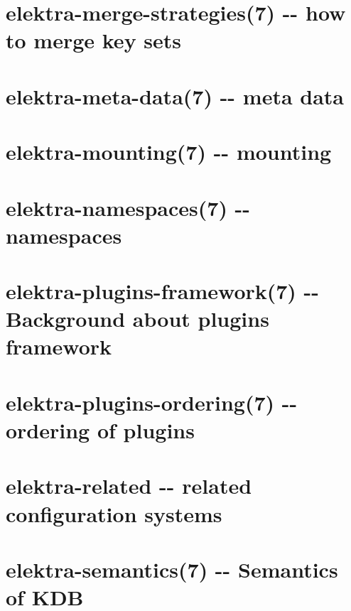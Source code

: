 \documentclass[twoside]{book}
\newcommand{\+}{\discretionary{\mbox{\scriptsize$\hookleftarrow$}}{}{}}
\begin{document}
\chapter{elektra-\/merge-\/strategies(7) -\/-\/ how to merge key sets}
\label{md_doc_help_elektra-merge-strategy}
\hypertarget{md_doc_help_elektra-merge-strategy}{}

\chapter{elektra-\/meta-\/data(7) -\/-\/ meta data}
\label{md_doc_help_elektra-meta-data}
\hypertarget{md_doc_help_elektra-meta-data}{}

\chapter{elektra-\/mounting(7) -\/-\/ mounting}
\label{md_doc_help_elektra-mounting}
\hypertarget{md_doc_help_elektra-mounting}{}

\chapter{elektra-\/namespaces(7) -\/-\/ namespaces}
\label{md_doc_help_elektra-namespaces}
\hypertarget{md_doc_help_elektra-namespaces}{}

\chapter{elektra-\/plugins-\/framework(7) -\/-\/ Background about plugins framework}
\label{md_doc_help_elektra-plugins-framework}
\hypertarget{md_doc_help_elektra-plugins-framework}{}

\chapter{elektra-\/plugins-\/ordering(7) -\/-\/ ordering of plugins}
\label{md_doc_help_elektra-plugins-ordering}
\hypertarget{md_doc_help_elektra-plugins-ordering}{}

\chapter{elektra-\/related -\/-\/ related configuration systems}
\label{md_doc_help_elektra-related}
\hypertarget{md_doc_help_elektra-related}{}

\chapter{elektra-\/semantics(7) -\/-\/ Semantics of K\+D\+B}
\label{md_doc_help_elektra-semantics}
\hypertarget{md_doc_help_elektra-semantics}{}

\end{document}
